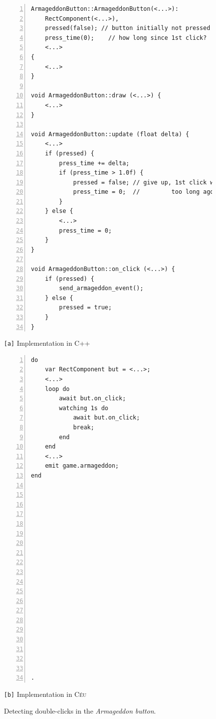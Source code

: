 \documentclass{vgtc}                          %
\newcommand{\CEU}{\textsc{C\'{e}u}\xspace}
\newcommand{\code}[1] {{\small{\texttt{#1}}}}
\newcommand{\ax}{\code{[a]}\xspace}
\newcommand{\bx}{\code{[b]}\xspace}
\begin{document}
\begin{figure}[t]
\begin{minipage}[t]{0.55\linewidth}
\begin{lstlisting}[numbers=left,xleftmargin=3em]
ArmageddonButton::ArmageddonButton(<...>):
    RectComponent(<...>),
    pressed(false); // button initially not pressed
    press_time(0);    // how long since 1st click?
    <...>
{
    <...>
}

void ArmageddonButton::draw (<...>) {
    <...>
}

void ArmageddonButton::update (float delta) {
    <...>
    if (pressed) {
        press_time += delta;
        if (press_time > 1.0f) {
            pressed = false; // give up, 1st click was
            press_time = 0;  //         too long ago
        }
    } else {
        <...>
        press_time = 0;
    }
}

void ArmageddonButton::on_click (<...>) {
    if (pressed) {
        send_armageddon_event();
    } else {
        pressed = true;
    }
}
\end{lstlisting}
\centering\small{\ax Implementation in C++}
\end{minipage}
%
\begin{minipage}[t]{0.45\linewidth}
\begin{lstlisting}[numbers=left,xleftmargin=3em]
do
    var RectComponent but = <...>;
    <...>
    loop do
        await but.on_click;
        watching 1s do
            await but.on_click;
            break;
        end
    end
    <...>
    emit game.armageddon;
end




















.
\end{lstlisting}
\centering\small{\bx Implementation in \CEU}
\end{minipage}
\caption{ Detecting double-clicks in the \emph{Armageddon button}.
\label{lst.armageddon}
}
\end{figure}
\end{document}
